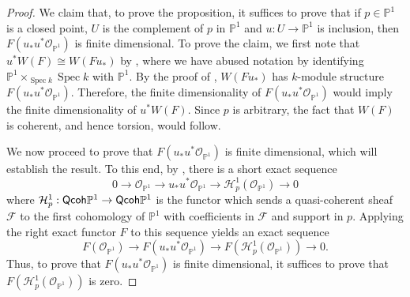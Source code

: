 \documentclass[10pt]{amsart}
\theoremstyle{definition}
\theoremstyle{remark}
\numberwithin{equation}{section}
\begin{document}
\begin{proof}
We claim that, to prove the proposition, it suffices to prove that if $p \in \mathbb{P}^{1}$ is a closed point, $U$ is the complement of $p$ in $\mathbb{P}^{1}$ and $u:U \rightarrow \mathbb{P}^{1}$ is inclusion, then $F(u_{*}u^{*}\mathcal{O}_{\mathbb{P}^{1}})$ is finite dimensional.  To prove the claim, we first note that
$u^{*}W(F) \cong W(Fu_{*})$ by \cite[Proposition 5.2]{N}, where we have abused notation by identifying $\mathbb{P}^{1} \times_{\operatorname{Spec }k} \operatorname{Spec }k$ with $\mathbb{P}^{1}$.  By the proof of \cite[Proposition 2.2]{N}, $W(Fu_{*})$ has $k$-module structure $F(u_{*}u^{*}\mathcal{O}_{\mathbb{P}^{1}})$.  Therefore, the finite dimensionality of $F(u_{*}u^{*}\mathcal{O}_{\mathbb{P}^{1}})$ would imply the finite dimensionality of $u^{*}W(F)$.  Since $p$ is arbitrary, the fact that $W(F)$ is coherent, and hence torsion, would follow.

We now proceed to prove that $F(u_{*}u^{*}\mathcal{O}_{\mathbb{P}^{1}})$ is finite dimensional, which will establish the result.  To this end, by \cite[Corollary 1.9]{Hart2}, there is a short exact sequence
$$
0 \rightarrow \mathcal{O}_{\mathbb{P}^{1}} \rightarrow u_{*}u^{*}\mathcal{O}_{\mathbb{P}^{1}} \rightarrow \mathcal{H}_{p}^{1}(\mathcal{O}_{\mathbb{P}^{1}}) \rightarrow 0
$$
where $\mathcal{H}_{p}^{1}:{\sf Qcoh }\mathbb{P}^{1} \rightarrow {\sf Qcoh }\mathbb{P}^{1}$ is the functor which sends a quasi-coherent sheaf $\mathcal{F}$ to the first cohomology of $\mathbb{P}^{1}$ with coefficients in $\mathcal{F}$ and support in $p$.  Applying the right exact functor $F$ to this sequence yields an exact sequence
$$
F(\mathcal{O}_{\mathbb{P}^{1}}) \rightarrow F(u_{*}u^{*}\mathcal{O}_{\mathbb{P}^{1}}) \rightarrow F(\mathcal{H}_{p}^{1}(\mathcal{O}_{\mathbb{P}^{1}})) \rightarrow 0.
$$
Thus, to prove that $F(u_{*}u^{*}\mathcal{O}_{\mathbb{P}^{1}})$ is finite dimensional, it suffices to prove that $F(\mathcal{H}_{p}^{1}(\mathcal{O}_{\mathbb{P}^{1}}))$ is zero.


\end{proof}
\end{document}
